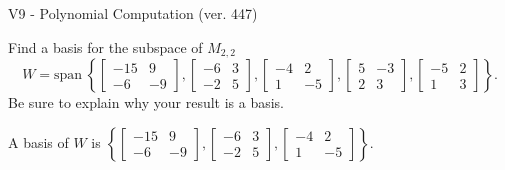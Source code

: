 \begin{exercise}
  \begin{exerciseTitle}V9 - Polynomial Computation (ver. 447)\end{exerciseTitle}
  \begin{exerciseStatement}
    Find a basis for the subspace of \(M_{2,2}\) 
\[W=\mathrm{span}\ \left\{\left[\begin{array}{cc}
-15 & 9 \\
-6 & -9
\end{array}\right] , \left[\begin{array}{cc}
-6 & 3 \\
-2 & 5
\end{array}\right] , \left[\begin{array}{cc}
-4 & 2 \\
1 & -5
\end{array}\right] , \left[\begin{array}{cc}
5 & -3 \\
2 & 3
\end{array}\right] , \left[\begin{array}{cc}
-5 & 2 \\
1 & 3
\end{array}\right]\right\}.\]
 Be sure to explain why your result is a basis.


  \end{exerciseStatement}
  \begin{exerciseAnswer}
   A basis of \(W\) is  \(\left\{\left[\begin{array}{cc}
-15 & 9 \\
-6 & -9
\end{array}\right] , \left[\begin{array}{cc}
-6 & 3 \\
-2 & 5
\end{array}\right] , \left[\begin{array}{cc}
-4 & 2 \\
1 & -5
\end{array}\right]\right\}\).
  


  \end{exerciseAnswer}
\end{exercise}